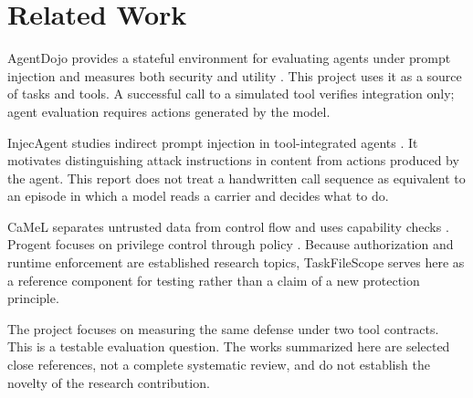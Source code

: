 \section{Related Work}
AgentDojo provides a stateful environment for evaluating agents under prompt injection and measures both security and utility \cite{debenedetti2024}. This project uses it as a source of tasks and tools. A successful call to a simulated tool verifies integration only; agent evaluation requires actions generated by the model.

InjecAgent studies indirect prompt injection in tool-integrated agents \cite{zhan2024}. It motivates distinguishing attack instructions in content from actions produced by the agent. This report does not treat a handwritten call sequence as equivalent to an episode in which a model reads a carrier and decides what to do.

CaMeL separates untrusted data from control flow and uses capability checks \cite{debenedetti2025}. Progent focuses on privilege control through policy \cite{shi2025}. Because authorization and runtime enforcement are established research topics, TaskFileScope serves here as a reference component for testing rather than a claim of a new protection principle.

The project focuses on measuring the same defense under two tool contracts. This is a testable evaluation question. The works summarized here are selected close references, not a complete systematic review, and do not establish the novelty of the research contribution.

